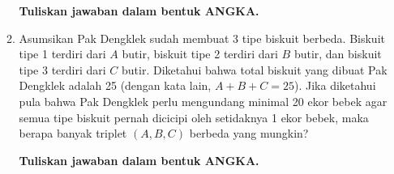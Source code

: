 \documentclass[a4paper]{article}
\begin{document}
\begin{enumerate}
\begin{enumerate}
      \textbf{Tuliskan jawaban dalam bentuk ANGKA.}

      \item Asumsikan Pak Dengklek sudah membuat 3 tipe biskuit berbeda. Biskuit tipe 1 terdiri dari $A$ butir, biskuit tipe 2 terdiri dari $B$ butir, dan biskuit tipe 3 terdiri dari $C$ butir. Diketahui bahwa total biskuit yang dibuat Pak Dengklek adalah 25 (dengan kata lain, $A + B + C = 25$). Jika diketahui pula bahwa Pak Dengklek perlu mengundang minimal 20 ekor bebek agar semua tipe biskuit pernah dicicipi oleh setidaknya 1 ekor bebek, maka berapa banyak triplet $( A, B, C )$ berbeda yang mungkin?
      
      \textbf{Tuliskan jawaban dalam bentuk ANGKA.}
    \end{enumerate}
  \end{enumerate}
\end{document}
